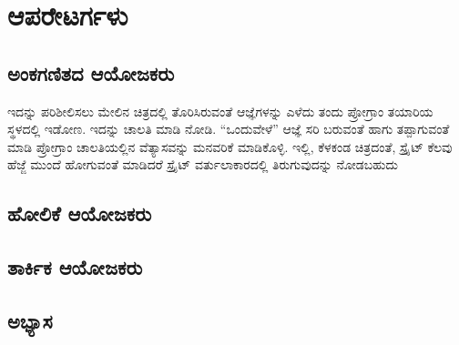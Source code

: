 \chapter{ಆಪರೇಟರ್ಗಳು}
\SampleProgram

\section{ಅಂಕಗಣಿತದ ಆಯೋಜಕರು}
ಇದನ್ನು ಪರಿಶೀಲಿಸಲು ಮೇಲಿನ ಚಿತ್ರದಲ್ಲಿ ತೊರಿಸಿರುವಂತೆ ಆಜ್ಞೆಗಳನ್ನು ಎಳೆದು ತಂದು ಪ್ರೋಗ್ರಾಂ ತಯಾರಿಯ ಸ್ಥಳದಲ್ಲಿ ಇಡೋಣ. ಇದನ್ನು ಚಾಲತಿ ಮಾಡಿ ನೋಡಿ. “ಒಂದುವೇಳೆ” ಆಜ್ಞೆ ಸರಿ ಬರುವಂತೆ ಹಾಗು ತಪ್ಪಾಗುವಂತೆ ಮಾಡಿ ಪ್ರೋಗ್ರಾಂ ಚಾಲತಿಯಲ್ಲಿನ ವೆತ್ಯಾಸವನ್ನು ಮನವರಿಕೆ ಮಾಡಿಕೊಳ್ಳಿ. ಇಲ್ಲಿ, ಕೆಳಕಂಡ ಚಿತ್ರದಂತೆ, ಸ್ಪ್ರೈಟ್ ಕೆಲವು ಹೆಜ್ಜೆ ಮುಂದೆ ಹೋಗುವಂತೆ ಮಾಡಿದರೆ ಸ್ಪ್ರೈಟ್ ವರ್ತುಲಾಕಾರದಲ್ಲಿ ತಿರುಗುವುದನ್ನು ನೋಡಬಹುದು

\section{ಹೋಲಿಕೆ ಆಯೋಜಕರು}


\section{ತಾರ್ಕಿಕ ಆಯೋಜಕರು}

\section{ಅಭ್ಯಾಸ }